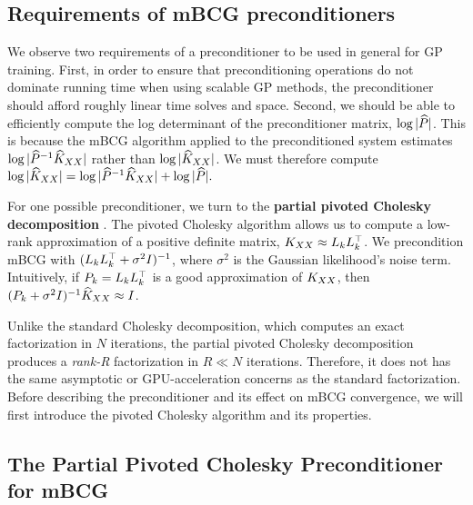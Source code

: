 \subsection{Requirements of mBCG preconditioners}
We observe two requirements of a preconditioner to be used in general for GP training.
First, in order to ensure that preconditioning operations do not dominate running time when using scalable GP methods, the preconditioner should afford roughly linear time solves and space.
Second, we should be able to efficiently compute the log determinant of the preconditioner matrix, $\log \vert \widehat{P} \vert$.
This is because the mBCG algorithm applied to the preconditioned system estimates $\log \vert \widehat{P}^{-1}\widehat{K}_{XX} \vert$ rather than $\log \vert \widehat{K}_{XX} \vert$. We must therefore compute
$
  \label{eq:logdet_adjusted}
  \log \vert \widehat{K}_{XX} \vert = \log \vert \widehat{P}^{-1}\widehat{K}_{XX} \vert + \log \vert \widehat{P} \vert.
$

For one possible preconditioner, we turn to the {\bf partial pivoted Cholesky decomposition} \cite{harbrecht2012low}.
The pivoted Cholesky algorithm allows us to compute a low-rank approximation of a positive definite matrix, $K_{XX} \approx L_{k} L_{k}^{\top}$.
We precondition mBCG with $(L_k L_k^\top + \sigma^2 I)^{-1}$, where $\sigma^2$ is the Gaussian likelihood's noise term.
Intuitively, if $P_{k}=L_{k}L_{k}^{\top}$ is a good approximation of $K_{XX}$, then $(P_{k} + \sigma^{2}I)^{-1}\widehat{K}_{XX} \approx I$.

Unlike the standard Cholesky decomposition, which computes an exact factorization in $N$ iterations,
the partial pivoted Cholesky decomposition produces a \emph{rank-R} factorization in $R \ll N$ iterations.
Therefore, it does not has the same asymptotic or GPU-acceleration concerns as the standard factorization.
Before describing the preconditioner and its effect on mBCG convergence, we will first introduce the pivoted Cholesky algorithm and its properties.


\subsection{The Partial Pivoted Cholesky Preconditioner for mBCG}

